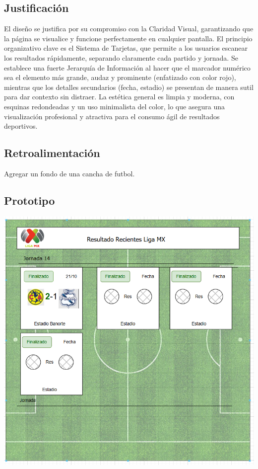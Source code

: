 \documentclass[11pt]{scrartcl}
\begin{document}
\subsection{Justificación}
El diseño se justifica por su compromiso con la Claridad Visual, garantizando que la página se visualice y funcione perfectamente en cualquier pantalla. El principio organizativo clave es el Sistema de Tarjetas, que permite a los usuarios escanear los resultados rápidamente, separando claramente cada partido y jornada. Se establece una fuerte Jerarquía de Información al hacer que el marcador numérico sea el elemento más grande, audaz y prominente (enfatizado con color rojo), mientras que los detalles secundarios (fecha, estadio) se presentan de manera sutil para dar contexto sin distraer. La estética general es limpia y moderna, con esquinas redondeadas y un uso minimalista del color, lo que asegura una visualización profesional y atractiva para el consumo ágil de resultados deportivos.


\subsection{Retroalimentación}
Agregar un fondo de una cancha de futbol.

\subsection{Prototipo}
\begin{center}
    \includegraphics[scale=0.7]{prototipo.png}
\end{center}
\end{document}

